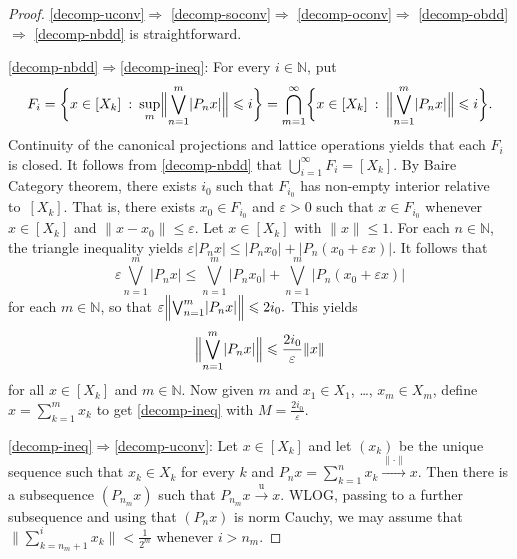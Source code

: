 \documentclass[12pt]{amsart}
\theoremstyle{plain}
\theoremstyle{definition}
\newcommand{\abs}[1]{\lvert#1\rvert}
\newcommand{\norm}[1]{\lVert#1\rVert}
\newcommand{\bignorm}[1]{\bigl\lVert#1\bigr\rVert}
\newcommand{\Bignorm}[1]{\Bigl\lVert#1\Bigr\rVert}
\renewcommand{\mid}{\::\:}
\newcommand{\goesu}{\xrightarrow{\mathrm{u}}} %
\newcommand{\goesnorm}{\xrightarrow{\norm{\cdot}}} %
\renewcommand{\le}{\leqslant}
\begin{document}
\begin{proof}
  \eqref{decomp-uconv}$\Rightarrow$%
  \eqref{decomp-soconv}$\Rightarrow$%
  \eqref{decomp-oconv}$\Rightarrow$%
  \eqref{decomp-obdd}$\Rightarrow$%
  \eqref{decomp-nbdd} is straightforward.
  
  \eqref{decomp-nbdd}$\Rightarrow$\eqref{decomp-ineq}: For every
  $i\in\mathbb N$, put
  \begin{displaymath}
    F_i=\biggl\{x\in[X_k]\mid\sup\limits_m
    \Bignorm{\bigvee_{n=1}^m\abs{P_nx}}\le i\biggr\}
    =\bigcap_{m=1}^\infty\biggl\{x\in[X_k]\mid
    \Bignorm{\bigvee_{n=1}^m\abs{P_nx}}\le i\biggr\}.
  \end{displaymath}
  Continuity of the canonical projections and lattice operations
  yields that each $F_i$ is closed. It follows from
  \eqref{decomp-nbdd} that $\bigcup_{i=1}^\infty F_i=[X_k]$. By Baire
  Category theorem, there exists $i_0$ such that $F_{i_0}$ has
  non-empty interior relative to~$[X_k]$. That is, there exists
  $x_0\in F_{i_0}$ and $\varepsilon>0$ such that $x\in F_{i_0}$
  whenever $x\in[X_k]$ and $\norm{x-x_0}\le\varepsilon$. Let
  $x\in[X_k]$ with $\norm{x}\le 1$. For each $n\in\mathbb N$, the
  triangle inequality yields
  \begin{math}
    \varepsilon\abs{P_nx}\le\abs{P_nx_0}+\abs{P_n(x_0+\varepsilon x)}.
  \end{math}
  It follows that
  \begin{displaymath}
    \varepsilon\bigvee_{n=1}^m\abs{P_nx}\le
    \bigvee_{n=1}^m\abs{P_nx_0}+
    \bigvee_{n=1}^m\abs{P_n(x_0+\varepsilon x)}
  \end{displaymath}
  for each $m\in\mathbb N$, so that 
  \begin{math}
    \varepsilon\Bignorm{\bigvee_{n=1}^m\abs{P_nx}}\le 2i_0.
  \end{math}
  This yields
  \begin{displaymath}
    \Bignorm{\bigvee_{n=1}^m\abs{P_nx}}
    \le\frac{2i_0}{\varepsilon}\norm{x}
  \end{displaymath}
   for all $x\in[X_k]$ and $m\in\mathbb N$. Now given $m$ and
  $x_1\in X_1$, \dots, $x_m\in X_m$, define $x=\sum_{k=1}^mx_k$ to get
  \eqref{decomp-ineq} with $M=\frac{2i_0}{\varepsilon}$.

  \eqref{decomp-ineq}$\Rightarrow$\eqref{decomp-uconv}:
  Let $x\in[X_k]$ and let $(x_k)$ be the unique sequence such that
  $x_k\in X_k$ for every $k$ and $P_nx=\sum_{k=1}^nx_k\goesnorm
  x$. Then there is a subsequence $(P_{n_m}x)$ such that
  $P_{n_m}x\goesu x$. WLOG, passing to a further
  subsequence and using that $(P_nx)$ is norm Cauchy, we may assume
  that
  \begin{math}
    \bignorm{\sum_{k=n_m+1}^ix_k}<\frac{1}{2^m}
  \end{math}
  whenever $i>n_m$.


\end{proof}
\end{document}
